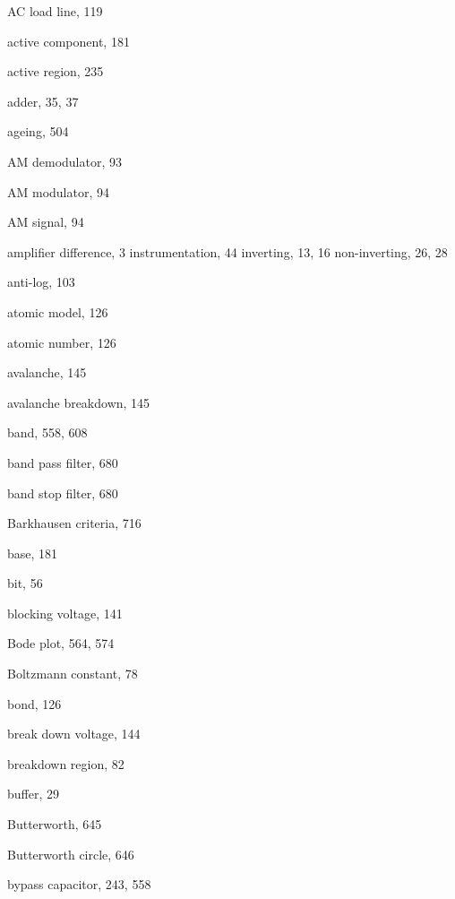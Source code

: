 \begin{theindex}
\begin{otherlanguage}{english}
  \item AC load line, 119
  \item active component, 181
  \item active region, 235
  \item adder, 35, 37
  \item ageing, 504
  \item AM demodulator, 93
  \item AM modulator, 94
  \item AM signal, 94
  \item amplifier
    \subitem difference, 3
    \subitem instrumentation, 44
    \subitem inverting, 13, 16
    \subitem non-inverting, 26, 28
  \item anti-log, 103
  \item atomic model, 126
  \item atomic number, 126
  \item avalanche, 145
  \item avalanche breakdown, 145

  \indexspace

  \item band, 558, 608
  \item band pass filter, 680
  \item band stop filter, 680
  \item Barkhausen criteria, 716
  \item base, 181
  \item bit, 56
  \item blocking voltage, 141
  \item Bode plot, 564, 574
  \item Boltzmann constant, 78
  \item bond, 126
  \item break down voltage, 144
  \item breakdown region, 82
  \item buffer, 29
  \item Butterworth, 645
  \item Butterworth circle, 646
  \item bypass capacitor, 243, 558

  \indexspace


\end{otherlanguage}
\end{theindex}
